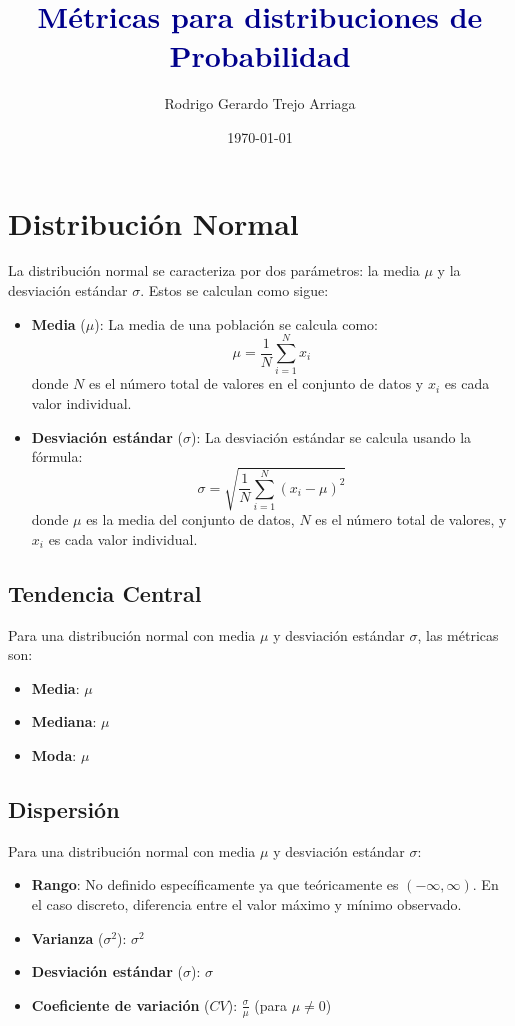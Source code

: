 \documentclass[11pt]{article}
\begin{document}
	
	

\title{\LARGE \textcolor{darkBlue}{Métricas para distribuciones de Probabilidad}}
\author{Rodrigo Gerardo Trejo Arriaga}
\date{\today}

\maketitle

\thispagestyle{fancy} 

\section*{Distribución Normal}
La distribución normal se caracteriza por dos parámetros: la media \(\mu\) y la desviación estándar \(\sigma\). Estos se calculan como sigue:
\begin{itemize}
	\item \textbf{Media} (\(\mu\)): La media de una población se calcula como:
	\[
	\mu = \frac{1}{N} \sum_{i=1}^{N} x_i
	\]
	donde \(N\) es el número total de valores en el conjunto de datos y \(x_i\) es cada valor individual.
	
	\item \textbf{Desviación estándar} (\(\sigma\)): La desviación estándar se calcula usando la fórmula:
	\[
	\sigma = \sqrt{\frac{1}{N} \sum_{i=1}^{N} (x_i - \mu)^2}
	\]
	donde \(\mu\) es la media del conjunto de datos, \(N\) es el número total de valores, y \(x_i\) es cada valor individual.
\end{itemize}

\subsection*{Tendencia Central}
Para una distribución normal con media \(\mu\) y desviación estándar \(\sigma\), las métricas son:
\begin{itemize}
	\item \textbf{Media}: \(\mu\)
	\item \textbf{Mediana}: \(\mu\)
	\item \textbf{Moda}: \(\mu\)
\end{itemize}

\subsection*{Dispersión}
Para una distribución normal con media \(\mu\) y desviación estándar \(\sigma\):
\begin{itemize}
	\item \textbf{Rango}: No definido específicamente ya que teóricamente es \((-\infty, \infty)\). En el caso discreto, diferencia entre el valor máximo y mínimo observado.
	\item \textbf{Varianza} (\(\sigma^2\)): \(\sigma^2\)
	\item \textbf{Desviación estándar} (\(\sigma\)): \(\sigma\)
	\item \textbf{Coeficiente de variación} (\(CV\)): \(\frac{\sigma}{\mu}\) (para \(\mu \neq 0\))
\end{itemize}
\end{document}

